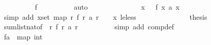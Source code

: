 \begin{isabellebody}
\ \ \ \ \ \ \ \ \isamarkupfalse%
\ f{\isacharparenleft}{}{\isacharparenright}\isanewline
\ \ \ \ \ \ \ \ \isamarkupfalse%
\ auto\isanewline
\ \ \ \ \ \ \isamarkupfalse%
\isanewline
\ \ \ \ \ \ \isamarkupfalse%
\ {\isachardoublequoteopen}{\isasymforall}x{\isasymin}{\isacharbraceleft}{}{\isachardot}{\isachardot}{\isacharless}{}{}{}{}{\isacharbraceright}{\isachardot}\ {}\ {\isasymle}\ f\ x\ {\isacharparenleft}a\ x{\isacharparenright}{\isachardoublequoteclose}\isanewline
\ \ \ \ \ \ \ \ \isamarkupfalse%
\ {\isacharparenleft}simp\ add{\isacharcolon}\ {\isacartoucheopen}{\isasymforall}x{\isasymin}set\ {\isacharparenleft}map\ {\isacharparenleft}{\isasymlambda}r{\isachardot}\ f\ r\ {\isacharparenleft}a\ r{\isacharparenright}{\isacharparenright}\ {\isacharbrackleft}{}{\isachardot}{\isachardot}{\isacharless}{}{}{}{}{\isacharbrackright}{\isacharparenright}{\isachardot}\ {}\ {\isacharless}\ x{\isacartoucheclose}\ le{\isacharunderscore}less{\isacharparenright}\isanewline
\ \ \ \ \ \ \isamarkupfalse%
\isanewline
\ \ \ \ \ \ \isamarkupfalse%
\ {\isacharquery}thesis\isanewline
\ \ \ \ \ \ \ \ \isamarkupfalse%
\ sum{\isacharunderscore}list{\isacharunderscore}nat{\isacharbrackleft}of\ {\isachardoublequoteopen}{\isacharbrackleft}{}{\isachardot}{\isachardot}{\isacharless}{}{}{}{}{\isacharbrackright}{\isachardoublequoteclose}\ {\isachardoublequoteopen}{\isacharparenleft}{\isasymlambda}r{\isachardot}\ f\ r\ {\isacharparenleft}a\ r{\isacharparenright}{\isacharparenright}{\isachardoublequoteclose}{\isacharbrackright}\isanewline
\ \ \ \ \ \ \ \ \isamarkupfalse%
\ {\isacharparenleft}simp\ add{\isacharcolon}\ comp{\isacharunderscore}def{\isacharparenright}\isanewline
\ \ \ \ \isamarkupfalse%
\isanewline
\ \ \isamarkupfalse%
\isanewline
\isanewline
\ \ \isamarkupfalse%
\ {\isachardoublequoteopen}{\isacharquery}fa\ {\isacharless}{\isachartilde}{\isachartilde}{\isachargreater}\ map\ int\ {\isacharbrackleft}{}{\isachardot}{\isachardot}{\isacharless}{}{}{}{}{\isacharplus}{}{\isacharbrackright}{\isachardoublequoteclose}\isanewline
\ \ \isamarkupfalse%
{\isacharminus}\isanewline
\ \ \ \ \isamarkupfalse%

\end{isabellebody}

